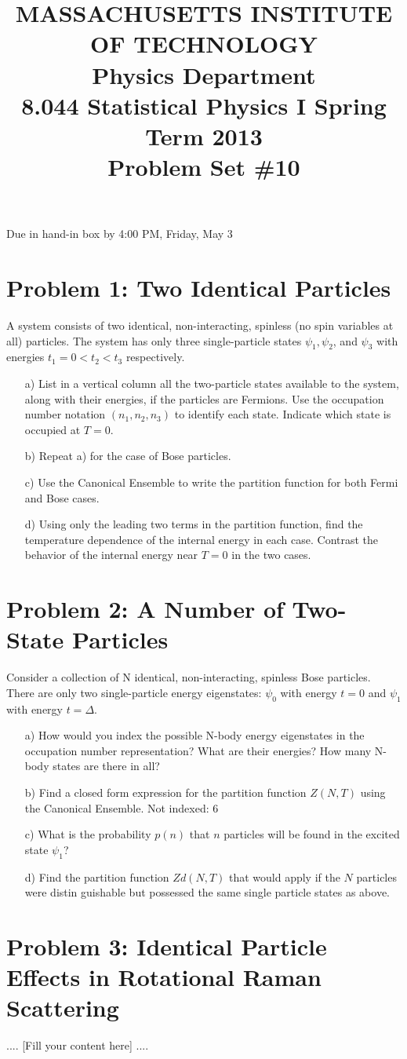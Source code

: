 \documentclass[12pt]{report}
\title{MASSACHUSETTS INSTITUTE OF TECHNOLOGY\\
    Physics Department\\
    8.044 Statistical Physics I Spring Term 2013\\
    Problem Set \#10}
\begin{document}
\maketitle

Due in hand-in box by 4:00 PM, Friday, May 3

\section*{Problem 1: Two Identical Particles}
A system consists of two identical, non-interacting, spinless (no spin variables at all) particles. 
The system has only three single-particle states $\psi_1, \psi_2$, and $\psi_3$ with energies $t_1 = 0 < t_2 < t_3$ 
respectively. 

\begin{itemize}
\item[a)] List in a vertical column all the two-particle states available to the system, along 
with their energies, if the particles are Fermions. Use the occupation number notation 
$(n_1,n_2,n_3)$ to identify each state. Indicate which state is occupied at $T = 0$. 
\item[b)] Repeat a) for the case of Bose particles. 
\item[c)] Use the Canonical Ensemble to write the partition function for both Fermi and Bose 
cases. 
\item[d)] Using only the leading two terms in the partition function, ﬁnd the temperature dependence of the internal energy in each case. Contrast the behavior of the internal 
energy near $T = 0$ in the two cases. 
\end{itemize}

\section*{Problem 2: A Number of Two-State Particles}
Consider a collection of N identical, non-interacting, spinless Bose particles. There are only 
two single-particle energy eigenstates: $\psi_0$ with energy $t = 0$ and $\psi_1$ with energy $t = \Delta$. 

\begin{itemize}
\item[a)] How would you index the possible N-body energy eigenstates in the occupation number 
representation? What are their energies? How many N-body states are there in all? 
\item[b)] Find a closed form expression for the partition function $Z(N, T )$ using the Canonical 
Ensemble. 
Not indexed: 6
\item[c)] What is the probability $p(n)$ that $n$ particles will be found in the excited state $\psi_1$? 
\item[d)] Find the partition function $Zd(N, T )$ that would apply if the $N$ particles were distin­
guishable but possessed the same single particle states as above. 

\end{itemize}

\section*{Problem 3: Identical Particle Effects in Rotational Raman Scattering}
.... [Fill your content here] ....
\end{document}
